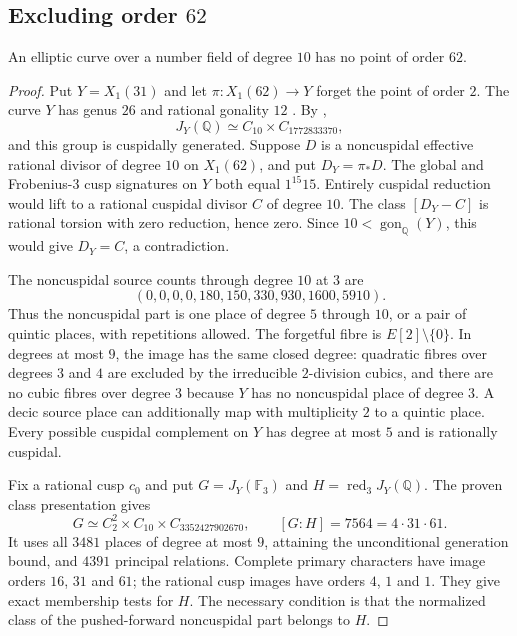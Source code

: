 \subsection{Excluding order $62$}\label{sec:d31a62}
\begin{proposition}\label{prop:decic62-exclusion}
An elliptic curve over a number field of degree $10$ has no point of order $62$.
\end{proposition}
\begin{proof}
Put $Y=X_1(31)$ and let $\pi:X_1(62)\longrightarrow Y$ forget the point of order $2$.
The curve $Y$ has genus $26$ and rational gonality $12$ \cite{DvH}.
By \cite[Theorems~3.1 and~4.13, Table~2]{DEHMZ},
\[
 J_Y(\mathbb Q)\simeq C_{10}\times C_{1772833370},
\]
and this group is cuspidally generated.
Suppose $D$ is a noncuspidal effective rational divisor of degree $10$ on $X_1(62)$,
and put $D_Y=\pi_*D$.
The global and Frobenius-$3$ cusp signatures on $Y$ both equal $1^{15}15$.
Entirely cuspidal reduction would lift to a rational cuspidal divisor $C$ of degree $10$.
The class $[D_Y-C]$ is rational torsion with zero reduction, hence zero.
Since $10<\operatorname{gon}_{\mathbb Q}(Y)$, this would give $D_Y=C$, a contradiction.

The noncuspidal source counts through degree $10$ at $3$ are
\[
 (0,0,0,0,180,150,330,930,1600,5910).
\]
Thus the noncuspidal part is one place of degree $5$ through $10$,
or a pair of quintic places, with repetitions allowed.
The forgetful fibre is $E[2]\setminus\{0\}$.
In degrees at most $9$, the image has the same closed degree:
quadratic fibres over degrees $3$ and $4$ are excluded by the
irreducible $2$-division cubics, and there are no cubic fibres over degree $3$
because $Y$ has no noncuspidal place of degree $3$.
A decic source place can additionally map with multiplicity $2$ to a quintic place.
Every possible cuspidal complement on $Y$ has degree at most $5$ and is rationally cuspidal.

Fix a rational cusp $c_0$ and put $G=J_Y(\mathbb F_3)$ and
$H=\operatorname{red}_3J_Y(\mathbb Q)$.
The proven class presentation gives
\[
 G\simeq C_2^2\times C_{10}\times C_{3352427902670},
 \qquad [G:H]=7564=4\cdot31\cdot61.
\]
It uses all $3481$ places of degree at most $9$, attaining the
unconditional generation bound, and $4391$ principal relations.
Complete primary characters have image orders $16$, $31$ and $61$;
the rational cusp images have orders $4$, $1$ and $1$.
They give exact membership tests for $H$.
The necessary condition is that the normalized class of the
pushed-forward noncuspidal part belongs to $H$.


\end{proof}
